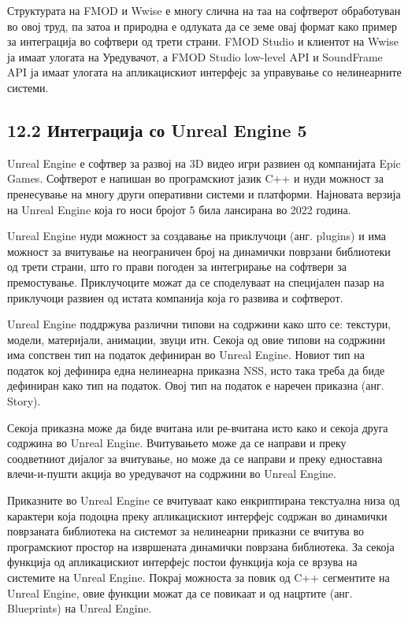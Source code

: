 Структурата на FMOD и Wwise е многу слична на таа на софтверот обработуван во овој труд, па затоа и природна е одлуката да се земе овај формат како пример за интеграција во софтвери од трети страни. FMOD Studio и клиентот на Wwise ја имаат улогата на Уредувачот, а FMOD Studio low-level API и SoundFrame API ја имаат улогата на апликацискиот интерфејс за управување со нелинеарните системи.

\subsection{12.2 Интеграција со Unreal Engine 5}

Unreal Engine е софтвер за развој на 3D видео игри развиен од компанијата Epic Games. Софтверот е напишан во програмскиот јазик C++ и нуди можност за пренесување на многу други оперативни системи и платформи. Најновата верзија на Unreal Engine која го носи бројот 5 била лансирана во 2022 година.

Unreal Engine нуди можност за создавање на приклучоци (анг. plugins) и има можност за вчитување на неограничен број на динамички поврзани библиотеки од трети страни, што го прави погоден за интегрирање на софтвери за премостување. Приклучоците можат да се споделуваат на специјален пазар на приклучоци развиен од истата компанија која го развива и софтверот.

Unreal Engine поддржува различни типови на содржини како што се: текстури, модели, материјали, анимации, звуци итн. Секоја од овие типови на содржини има сопствен тип на податок дефиниран во Unreal Engine. Новиот тип на податок кој дефинира една нелинеарна приказна NSS, исто така треба да биде дефиниран како тип на податок. Овој тип на податок е наречен приказна (анг. Story).

Секоја приказна може да биде вчитана или ре-вчитана исто како и секоја друга содржина во Unreal Engine. Вчитувањето може да се направи и преку соодветниот дијалог за вчитување, но може да се направи и преку едноставна влечи-и-пушти акција во уредувачот на содржини во Unreal Engine.

Приказните во Unreal Engine се вчитуваат како енкриптирана текстуална низа од карактери која подоцна преку апликацискиот интерфејс содржан во динамички поврзаната библиотека на системот за нелинеарни приказни се вчитува во програмскиот простор на извршената динамички поврзана библиотека. За секоја функција од апликацискиот интерфејс постои функција која се врзува на системите на Unreal Engine. Покрај можноста за повик од C++ сегментите на Unreal Engine, овие функции можат да се повикаат и од нацртите (анг. Blueprints) на Unreal Engine.

